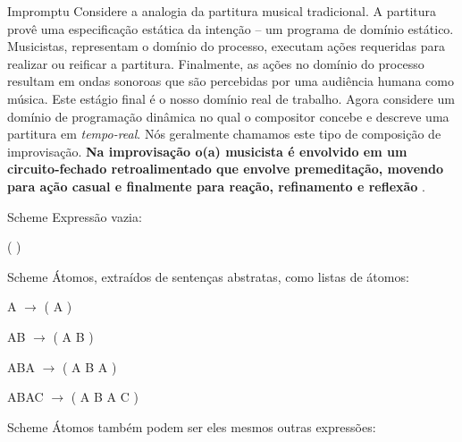 \documentclass[aspectratio=169]{beamer}
\begin{document}
\begin{frame}{Impromptu}
Considere a analogia da partitura musical tradicional. A partitura provê uma especificação estática da intenção -- um programa de domínio estático. Musicistas, representam o domínio do processo, executam ações requeridas para realizar ou reificar a partitura. Finalmente, as ações no domínio do processo resultam em ondas sonoroas que são percebidas por uma audiência humana como música. Este estágio final é o nosso domínio real de trabalho. Agora considere um domínio de programação dinâmica no qual o compositor concebe e descreve uma partitura em \emph{tempo-real}. Nós geralmente chamamos este tipo de composição de improvisação. \textbf{Na improvisação o(a) musicista é envolvido em um circuito-fechado retroalimentado que envolve premeditação, movendo para ação casual e finalmente para reação, refinamento e reflexão} \cite[p.~823]{sorensen_impromptu_2010}.
\end{frame}

\begin{frame}{Scheme}
Expressão vazia:

( )
\end{frame}

\begin{frame}[allowframebreaks]{Scheme}
Átomos, extraídos de sentenças abstratas, como listas de átomos:

A $\rightarrow$ ( A )

AB $\rightarrow$ ( A B )

ABA $\rightarrow$ ( A B A )

ABAC $\rightarrow$ ( A B A C )
\end{frame}


\begin{frame}{Scheme}
Átomos também podem ser eles mesmos outras expressões:

\lispdois
\end{frame}
\end{document}

